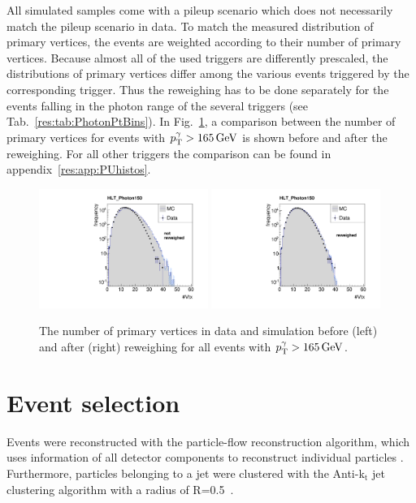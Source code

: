 All simulated samples come with a pileup scenario which does not necessarily match the pileup scenario in data. 
To match the measured distribution of primary vertices, the events are weighted according to their number of primary vertices. 
Because almost all of the used triggers are differently prescaled, the distributions of primary vertices differ among the various events triggered by the corresponding trigger.
Thus the reweighing has to be done separately for the events falling in the photon \pt range of the several triggers (see \mbox{Tab. \ref{res:tab:PhotonPtBins}}).
In \mbox{Fig. \ref{res:fig:PUreweighing}}, a comparison between the number of primary vertices for events with $p_{\text{T}}^{\gamma}>165\,\text{Ge}\kern-0.06667em\text{V}$ is shown before and after the reweighing. 
For all other triggers the comparison can be found in \mbox{appendix \ref{res:app:PUhistos}}.

\begin{figure}[tbp]
 \centering
    \includegraphics[width=0.49\textwidth]{figures/resolution/eventSelection/NVtxComparisonWoWeights6.pdf}
    \includegraphics[width=0.49\textwidth]{figures/resolution/eventSelection/NVtxComparison6.pdf} 
  \caption{The number of primary vertices in data and simulation before (left) and after (right) reweighing for all events with $p_{\text{T}}^{\gamma}>165\,\text{Ge}\kern-0.06667em\text{V}$.}  
 \label{res:fig:PUreweighing}
\end{figure}


\section{Event selection}
\label{res:sec:EventSelection}
Events were reconstructed with the particle-flow reconstruction algorithm, which uses information of all detector components to reconstruct individual particles \cite{CMS-PAS-PFT-09-001}.
Furthermore, particles belonging to a jet were clustered with the Anti-k$_{\text{t}}$ jet clustering algorithm with a radius of \mbox{R=0.5 \cite{Cacciari:2008gp}.}

